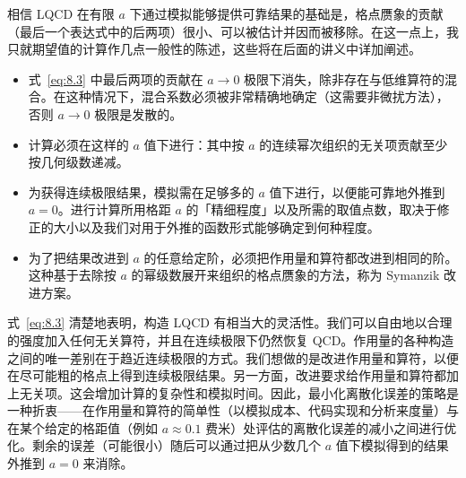 相信 LQCD 在有限 $a$ 下通过模拟能够提供可靠结果的基础是，格点赝象的贡献（最后一个表达式中的后两项）很小、可以被估计并因而被移除。在这一点上，我只就期望值的计算作几点一般性的陈述，这些将在后面的讲义中详加阐述。
\begin{itemize}
\item 式~\ref{eq:8.3} 中最后两项的贡献在 $a \to 0$ 极限下消失，除非存在与低维算符的混合。在这种情况下，混合系数必须被非常精确地确定（这需要非微扰方法），否则 $a \to 0$ 极限是发散的。
\item 计算必须在这样的 $a$ 值下进行：其中按 $a$ 的连续幂次组织的无关项贡献至少按几何级数递减。
\item 为获得连续极限结果，模拟需在足够多的 $a$ 值下进行，以便能可靠地外推到 $a = 0$。进行计算所用格距 $a$ 的「精细程度」以及所需的取值点数，取决于修正的大小以及我们对用于外推的函数形式能够确定到何种程度。
\item 为了把结果改进到 $a$ 的任意给定阶，必须把作用量和算符都改进到相同的阶。这种基于去除按 $a$ 的幂级数展开来组织的格点赝象的方法，称为 Symanzik 改进方案。
\end{itemize}

式~\ref{eq:8.3} 清楚地表明，构造 LQCD 有相当大的灵活性。我们可以自由地以合理的强度加入任何无关算符，并且在连续极限下仍然恢复 QCD。作用量的各种构造之间的唯一差别在于趋近连续极限的方式。我们想做的是改进作用量和算符，以便在尽可能粗的格点上得到连续极限结果。另一方面，改进要求给作用量和算符都加上无关项。这会增加计算的复杂性和模拟时间。因此，最小化离散化误差的策略是一种折衷——在作用量和算符的简单性（以模拟成本、代码实现和分析来度量）与在某个给定的格距值（例如 $a \approx 0.1$ 费米）处评估的离散化误差的减小之间进行优化。剩余的误差（可能很小）随后可以通过把从少数几个 $a$ 值下模拟得到的结果外推到 $a = 0$ 来消除。

